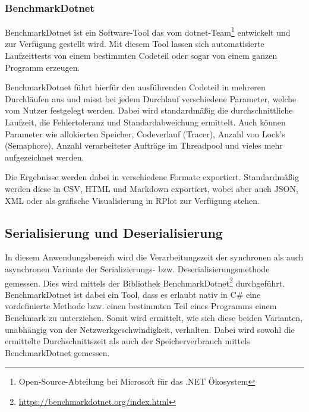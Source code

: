 \subsubsection{BenchmarkDotnet}
\label{BenchmarkDotnet}

BenchmarkDotnet ist ein Software-Tool das vom dotnet-Team\footnote{Open-Source-Abteilung bei Microsoft für das .NET Ökosystem} entwickelt und zur Verfügung gestellt wird. Mit diesem Tool lassen sich automatisierte Laufzeittests von einem bestimmten Codeteil oder sogar von einem ganzen Programm erzeugen.

BenchmarkDotnet führt hierfür den ausführenden Codeteil in mehreren Durchläufen aus und misst bei jedem Durchlauf verschiedene Parameter, welche vom Nutzer festgelegt werden. Dabei wird standardmäßig die durchschnittliche Laufzeit, die Fehlertoleranz und Standardabweichung ermittelt. Auch können Parameter wie allokierten Speicher, Codeverlauf (Tracer), Anzahl von Lock's (Semaphore), Anzahl verarbeiteter Aufträge im Threadpool und vieles mehr aufgezeichnet werden.

Die Ergebnisse werden dabei in verschiedene Formate exportiert. Standardmäßig werden diese in CSV, HTML und Markdown exportiert, wobei aber auch JSON, XML oder als grafische Visualisierung in RPlot zur Verfügung stehen.

\subsection{Serialisierung und Deserialisierung}
\label{subsec:serializierung-und-deserializierung}

In diesem Anwendungsbereich wird die Verarbeitungszeit der synchronen als auch asynchronen Variante der Serializierungs- bzw. Deserialisierungsmethode gemessen. Dies wird mittels der Bibliothek BenchmarkDotnet\footnote{\href{https://benchmarkdotnet.org/index.html}{https://benchmarkdotnet.org/index.html}} durchgeführt. BenchmarkDotnet ist dabei ein Tool, dass es erlaubt nativ in C\# eine vordefinierte Methode bzw. einen bestimmten Teil eines Programms einem Benchmark zu unterziehen. Somit wird ermittelt, wie sich diese beiden Varianten, unabhängig von der Netzwerkgeschwindigkeit, verhalten. Dabei wird sowohl die ermittelte Durchschnittszeit als auch der Speicherverbrauch mittels BenchmarkDotnet gemessen.

